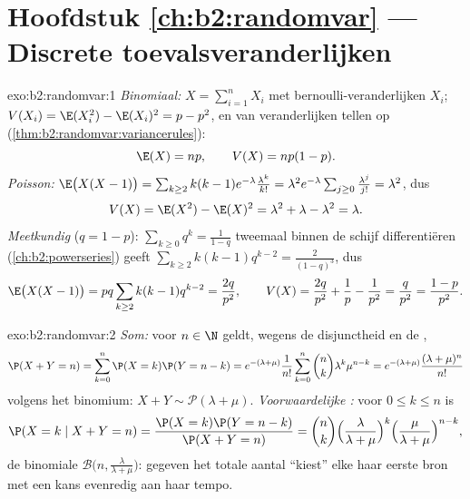 \section*{Hoofdstuk \ref{ch:b2:randomvar} --- Discrete toevalsveranderlijken}

\begin{solution}{exo:b2:randomvar:1}
\emph{Binomiaal:} $X = \sum_{i=1}^n X_i$ met 
bernoulli-veranderlijken $X_i$; $V(X_i) = \E(X_i^2) - \E(X_i)^2 = p
- p^2$, en  van  veranderlijken tellen op
(\cref{thm:b2:randomvar:variancerules}):
\[
\E(X) = np, \qquad V(X) = np(1-p) .
\]
\emph{Poisson:} $\E\bigl(X(X-1)\bigr) =
\sum_{k\geq2}k(k-1)e^{-\lambda}\frac{\lambda^k}{k!} = \lambda^2
e^{-\lambda}\sum_{j\geq0}\frac{\lambda^j}{j!} = \lambda^2$, dus
\[
V(X) = \E(X^2) - \E(X)^2
= \lambda^2 + \lambda - \lambda^2 = \lambda .
\]
\emph{Meetkundig} ($q = 1 - p$): $\sum_{k\geq0}q^k =
\frac{1}{1-q}$ tweemaal binnen de schijf differentiëren
(\cref{ch:b2:powerseries}) geeft $\sum_{k\geq2}k(k-1)q^{k-2} =
\frac{2}{(1-q)^3}$, dus
\[
\E\bigl(X(X-1)\bigr) = pq\sum_{k\geq2}k(k-1)q^{k-2}
= \frac{2q}{p^2},
\qquad
V(X) = \frac{2q}{p^2} + \frac1p - \frac{1}{p^2}
= \frac{q}{p^2} = \frac{1-p}{p^2} .
\]
\end{solution}

\begin{solution}{exo:b2:randomvar:2}
\emph{Som:} voor $n \in \N$ geldt, wegens de disjunctheid en de
,
\[
\P(X + Y = n)
= \sum_{k=0}^n \P(X = k)\P(Y = n - k)
= e^{-(\lambda + \mu)}\frac{1}{n!}
\sum_{k=0}^n \binom nk \lambda^k\mu^{n-k}
= e^{-(\lambda+\mu)}\frac{(\lambda + \mu)^n}{n!}
\]
volgens het binomium: $X + Y \sim \mathcal{P}(\lambda + \mu)$.
\emph{Voorwaardelijke :} voor $0 \leq k \leq n$ is
\[
\P(X = k \mid X + Y = n)
= \frac{\P(X = k)\P(Y = n - k)}{\P(X + Y = n)}
= \binom nk
\Bigl(\frac{\lambda}{\lambda+\mu}\Bigr)^{k}
\Bigl(\frac{\mu}{\lambda+\mu}\Bigr)^{n-k} ,
\]
de binomiale  $\mathcal{B}\bigl(n,
\frac{\lambda}{\lambda+\mu}\bigr)$: gegeven het totale aantal
``kiest'' elke   haar eerste bron met een
kans evenredig aan haar tempo.
\end{solution}

